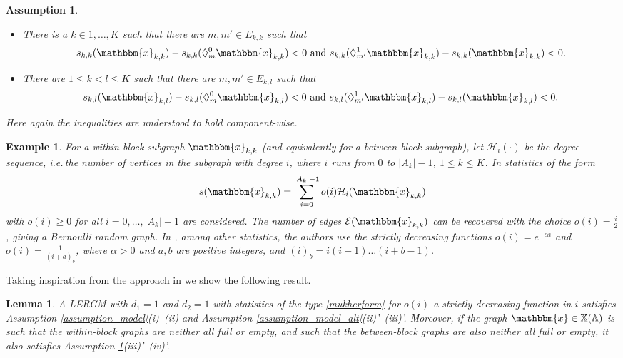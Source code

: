 \documentclass{article}
\newtheorem{Lemma}[Theorem]{Lemma}
\newtheorem{Assumption}[Theorem]{Assumption}
\newtheorem{Example}[Theorem]{Example}
\begin{document}
\begin{Assumption}
\label{assumption_observation_alt}
    \begin{itemize}
        \item[(iii)']  There is a $k \in 1, \ldots, K$  such that there are  $m, m' \in E_{k,k}$ such that 
        \begin{align*} 
            s_{k,k}(\mathbbm{x}_{k,k}) -s_{k,k}(\Diamond_{m}^{0}\mathbbm{x}_{k,k}) < 0 \text{ and } s_{k,k}(\Diamond_{m'}^{1}\mathbbm{x}_{k,k}) -s_{k,k}(\mathbbm{x}_{k,k}) < 0.     
        \end{align*}  
        \item[(iv)'] There are $ 1 \leq k < l  \leq K $ such that there are   $m,  m' \in E_{k,l}$  such that 
        \begin{align*} 
            s_{k,l}(\mathbbm{x}_{k,l}) -s_{k,l}(\Diamond_{m}^{0}\mathbbm{x}_{k,l}) < 0 \text{ and } s_{k,l}(\Diamond_{m'}^{1}\mathbbm{x}_{k,l}) -s_{k,l}(\mathbbm{x}_{k,l}) < 0 .
        \end{align*}
    \end{itemize}
    Here again  the inequalities are understood to hold component-wise.
\end{Assumption}

\begin{Example} \label{example_degree_seq}
    For a within-block subgraph $\mathbbm{x}_{k,k}$ (and equivalently for a between-block subgraph), let $\mathcal{H}_i(\cdot)$ be the degree sequence, i.e.\,the number of vertices in the subgraph with degree $i$, where $i$ runs from $0$ to $\vert A_k\vert-1 $, $1 \leq k \leq K$. In \cite{mukherjee2020degeneracy} statistics of the form
    \begin{align} \label{mukherform}
        s(\mathbbm{x}_{k,k})= \sum_{i=0}^{\vert A_k\vert-1} o(i) \mathcal{H}_i(\mathbbm{x}_{k,k}) 
    \end{align}
    with $o(i) \geq 0$ for all $i=0,\ldots,\vert A_k\vert-1  $ are considered. The number of edges $\mathcal{E}(\mathbbm{x}_{k,k})$ can be recovered with the choice $o(i)=\frac{i}{2}$, giving a Bernoulli random graph. 
In \cite{mukherjee2020degeneracy}, among other statistics,  the authors use the strictly decreasing functions 
$o(i)= e^{-\alpha i} $ and $ o(i)= \frac{1}{(i+a)_b}$, where  $\alpha>0$ and $a,b$ are positive integers, and $(i)_b=i(i+1)\ldots (i+b-1) $.
\end{Example}

Taking inspiration from the approach in \cite{mukherjee2020degeneracy} we show the following result. 
\begin{Lemma} 
    A LERGM  with $d_1= 1$ and $ d_2 = 1$  with  statistics of the type \eqref{mukherform} for $o(i)$ a strictly decreasing function in $i$ satisfies Assumption \ref{assumption_model}(i)--(ii) and Assumption \ref{assumption_model_alt}(ii)'--(iii)'. Moreover, if the graph $\mathbbm{x} \in \mathbb{X}(\mathbb{A})$ is such that the within-block graphs are neither all full or empty, and such that the between-block graphs are also neither all full or empty, it also satisfies Assumption \ref{assumption_observation_alt}(iii)'--(iv)'.
\end{Lemma}
\end{document}
